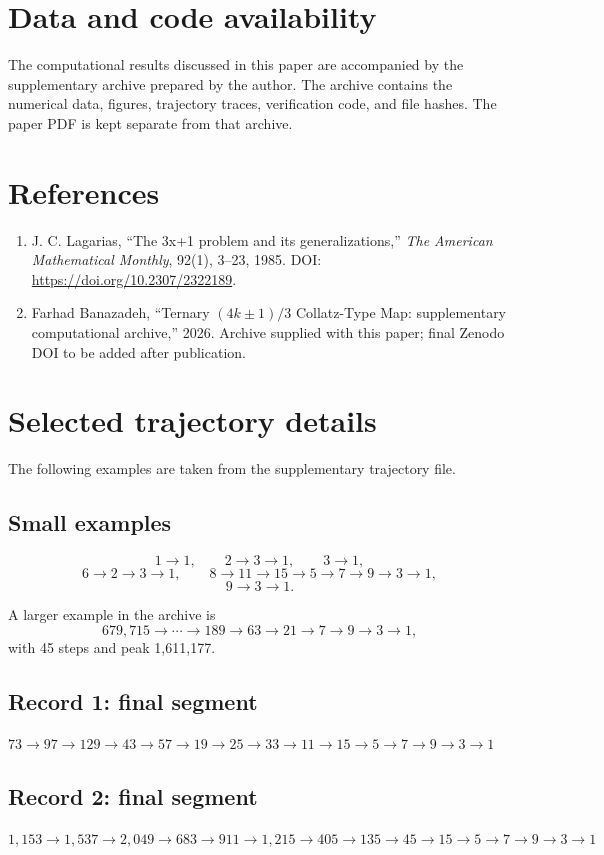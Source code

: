 \documentclass[11pt]{article}
\begin{document}
\section*{Data and code availability}
The computational results discussed in this paper are accompanied by the supplementary archive prepared by the author. The archive contains the numerical data, figures, trajectory traces, verification code, and file hashes. The paper PDF is kept separate from that archive.

\section*{References}
\begin{enumerate}[leftmargin=2em]
\item J. C. Lagarias, ``The 3x+1 problem and its generalizations,'' \emph{The American Mathematical Monthly}, 92(1), 3--23, 1985. DOI: \url{https://doi.org/10.2307/2322189}.
\item Farhad Banazadeh, ``Ternary $(4k\pm1)/3$ Collatz-Type Map: supplementary computational archive,'' 2026. Archive supplied with this paper; final Zenodo DOI to be added after publication.
\end{enumerate}

\appendix
\section{Selected trajectory details}
The following examples are taken from the supplementary trajectory file.

\subsection*{Small examples}
\[
1\to1,
\qquad
2\to3\to1,
\qquad
3\to1,
\]
\[
6\to2\to3\to1,
\qquad
8\to11\to15\to5\to7\to9\to3\to1,
\]
\[
9\to3\to1.
\]

A larger example in the archive is
\[
679,715\to\cdots\to189\to63\to21\to7\to9\to3\to1,
\]
with 45 steps and peak 1,611,177.

\subsection*{Record 1: final segment}
\begin{center}\small
$73\to97\to129\to43\to57\to19\to25\to33\to11\to15\to5\to7\to9\to3\to1$
\end{center}

\subsection*{Record 2: final segment}
\begin{center}\small
$1,153\to1,537\to2,049\to683\to911\to1,215\to405\to135\to45\to15\to5\to7\to9\to3\to1$
\end{center}
\end{document}
